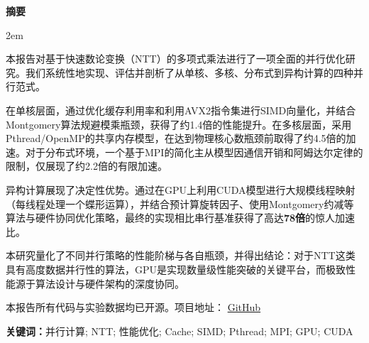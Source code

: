 \documentclass[a4paper]{article}
\newenvironment{cnabstract}{
    \par\small
    \noindent\mbox{}\par\vspace{-\baselineskip}
    \par\songti\parindent 2em
    }
    {\par\vspace{1em}}
\begin{document}
\clearpage
{}
\begin{center}{\songti\bfseries{摘\quad 要}}\end{center}\par\vspace{0.5em}
\begin{cnabstract}
本报告对基于快速数论变换（NTT）的多项式乘法进行了一项全面的并行优化研究。我们系统性地实现、评估并剖析了从单核、多核、分布式到异构计算的四种并行范式。

在单核层面，通过优化缓存利用率和利用AVX2指令集进行SIMD向量化，并结合Montgomery算法规避模乘瓶颈，获得了约1.4倍的性能提升。在多核层面，采用Pthread/OpenMP的共享内存模型，在达到物理核心数瓶颈前取得了约4.5倍的加速。对于分布式环境，一个基于MPI的简化主从模型因通信开销和阿姆达尔定律的限制，仅展现了约2.2倍的有限加速。

异构计算展现了决定性优势。通过在GPU上利用CUDA模型进行大规模线程映射（每线程处理一个蝶形运算），并结合预计算旋转因子、使用Montgomery约减等算法与硬件协同优化策略，最终的实现相比串行基准获得了高达\textbf{78倍}的惊人加速比。

本研究量化了不同并行策略的性能阶梯与各自瓶颈，并得出结论：对于NTT这类具有高度数据并行性的算法，GPU是实现数量级性能突破的关键平台，而极致性能源于算法设计与硬件架构的深度协同。

本报告所有代码与实验数据均已开源。项目地址： \href{https://github.com/aokimi0/parallel-programming}{GitHub}

\vspace{1em}
\noindent\textbf{关键词：}并行计算; NTT; 性能优化; Cache; SIMD; Pthread; MPI; GPU; CUDA
\end{cnabstract}
\end{document}
